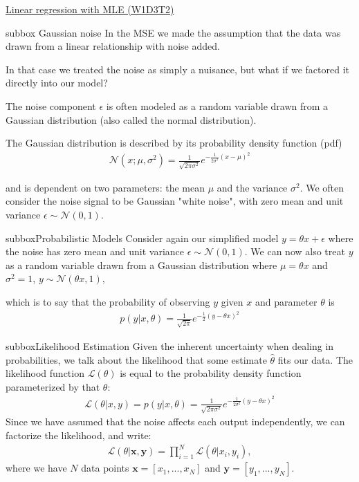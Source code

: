 \begin{textbox}{\href{https://compneuro.neuromatch.io/tutorials/W1D3_ModelFitting/student/W1D3_Tutorial2.html}{Linear regression with MLE (W1D3T2)}  }
\begin{subbox}{subbox}{ Gaussian noise}
\scriptsize
In the MSE we made the assumption that the data was drawn from a linear relationship with noise added.

In that case we treated the noise as simply a nuisance, but what if we factored it directly into our model?

The noise component $\epsilon$ is often modeled as a random variable drawn from a Gaussian distribution (also called the normal distribution).

The Gaussian distribution is described by its probability density function (pdf)
\begin{align}
\mathcal{N}(x; \mu, \sigma^2) = \frac{1}{\sqrt{2\pi\sigma^2}}e^{-\frac{1}{2\sigma^2}(x-\mu)^2}
\end{align}

and is dependent on two parameters: the mean $\mu$ and the variance $\sigma^2$. We often consider the noise signal to be Gaussian "white noise", with zero mean and unit variance
$\epsilon \sim \mathcal{N}(0, 1).
$

\end{subbox}
\begin{subbox}{subbox}{Probabilistic Models}
\scriptsize
Consider again our simplified model $y = \theta x + \epsilon$ where the noise has zero mean and unit variance $\epsilon \sim \mathcal{N}(0, 1)$. We can now also treat $y$ as a random variable drawn from a Gaussian distribution where $\mu = \theta x$ and $\sigma^2 = 1$, 
$y \sim \mathcal{N}(\theta x, 1),
$

which is to say that the probability of observing $y$ given $x$ and parameter $\theta$ is
\begin{align}
p(y|x,\theta) = \frac{1}{\sqrt{2\pi}}e^{-\frac{1}{2}(y-\theta x)^2}
\end{align}

\end{subbox}

\begin{subbox}{subbox}{Likelihood Estimation}
\scriptsize
 Given the inherent uncertainty when dealing in probabilities, we talk about the likelihood that some estimate $\hat{\theta}$ fits our data. The likelihood function $\mathcal{L}(\theta)$ is equal to the probability density function parameterized by that $\theta$:
\begin{align}
\mathcal{L}(\theta|x,y) = p(y|x,\theta) = \frac{1}{\sqrt{2\pi\sigma^2}}e^{-\frac{1}{2\sigma^2}(y-\theta x)^2}
\end{align}
Since we have assumed that the noise affects each output independently, we can factorize the likelihood, and write:
\begin{align}
\mathcal{L}(\theta|\mathbf{x}, \mathbf{y}) = \prod_{i=1}^N \mathcal{L}(\theta|x_i,y_i),
\end{align}
where we have $N$ data points $\mathbf{x} = [x_1,...,x_N]$ and $\mathbf{y} = [y_1,...,y_N]$.
\end{subbox}
\end{textbox}
